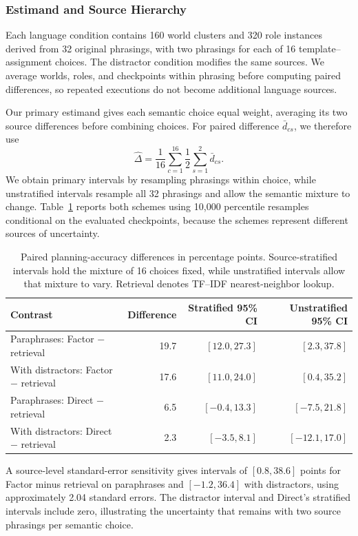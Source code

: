 \documentclass[sigconf,nonacm,balance=false]{aamas}
\newcommand{\tabstyle}{\small\setlength{\tabcolsep}{3pt}\renewcommand{\arraystretch}{1.10}}
\begin{document}
\subsubsection{Estimand and Source Hierarchy}

Each language condition contains 160 world clusters and 320 role instances derived from 32 original phrasings, with two phrasings for each of 16 template--assignment choices. The distractor condition modifies the same sources. We average worlds, roles, and checkpoints within phrasing before computing paired differences, so repeated executions do not become additional language sources.

Our primary estimand gives each semantic choice equal weight, averaging its two source differences before combining choices. For paired difference $\bar d_{cs}$, we therefore use
\[
\widehat\Delta=\frac{1}{16}\sum_{c=1}^{16}\frac{1}{2}\sum_{s=1}^{2}\bar d_{cs}.
\]
We obtain primary intervals by resampling phrasings within choice, while unstratified intervals resample all 32 phrasings and allow the semantic mixture to change. Table~\ref{tab:source-ci-new} reports both schemes using 10,000 percentile resamples conditional on the evaluated checkpoints, because the schemes represent different sources of uncertainty.

\begin{table}[!htbp]
\centering\tabstyle
\caption{Paired planning-accuracy differences in percentage points. Source-stratified intervals hold the mixture of 16 choices fixed, while unstratified intervals allow that mixture to vary. Retrieval denotes TF--IDF nearest-neighbor lookup.}
\label{tab:source-ci-new}
\begin{tabular}{@{}lrrr@{}}
\toprule
Contrast & Difference & Stratified 95\% CI & Unstratified 95\% CI\\\midrule
Paraphrases: Factor $-$ retrieval & 19.7 & $[12.0,27.3]$ & $[2.3,37.8]$\\
With distractors: Factor $-$ retrieval & 17.6 & $[11.0,24.0]$ & $[0.4,35.2]$\\
Paraphrases: Direct $-$ retrieval & 6.5 & $[-0.4,13.3]$ & $[-7.5,21.8]$\\
With distractors: Direct $-$ retrieval & 2.3 & $[-3.5,8.1]$ & $[-12.1,17.0]$\\
\bottomrule\end{tabular}\end{table}

A source-level standard-error sensitivity gives intervals of $[0.8,38.6]$ points for Factor minus retrieval on paraphrases and $[-1.2,36.4]$ with distractors, using approximately 2.04 standard errors. The distractor interval and Direct's stratified intervals include zero, illustrating the uncertainty that remains with two source phrasings per semantic choice.
\end{document}
